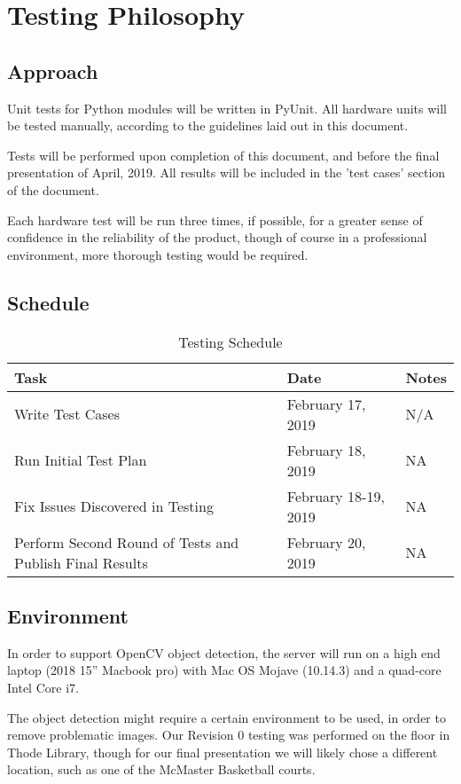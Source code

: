 \documentclass[11pt]{article}
\begin{document}
\section{Testing Philosophy}
\subsection{Approach}
Unit tests for Python modules will be written in PyUnit. All hardware units will be tested manually, according to the guidelines laid out in this document.

Tests will be performed upon completion of this document, and before the final presentation of April, 2019. All results will be included in the 'test cases' section of the document.

Each hardware test will be run three times, if possible, for a greater sense of confidence in the reliability of the product, though of course in a professional environment,
more thorough testing would be required.

\subsection{Schedule}
\begin{table}[H]
\centering
\label{my-label}
\begin{tabular}{|l|l|l|}
\hline
\textbf{Task} & \textbf{Date} & \textbf{Notes} \\ \hline
Write Test Cases & February 17, 2019 & N/A \\ \hline
Run Initial Test Plan & February 18, 2019 & NA \\ \hline
Fix Issues Discovered in Testing & February 18-19, 2019 & NA \\ \hline
Perform Second Round of Tests and Publish Final Results & February 20, 2019 & NA \\ \hline
\end{tabular}

\caption{Testing Schedule}
\end{table}
\subsection{Environment}
In order to support OpenCV object detection, the server will run on a high end laptop (2018 15'' Macbook pro) with Mac OS Mojave (10.14.3) and a quad-core Intel Core i7.

The object detection might require a certain environment to be used, in order to remove problematic images. Our Revision 0 testing was performed on the floor in Thode Library, though
for our final presentation we will likely chose a different location, such as one of the McMaster Basketball courts.
\end{document}
